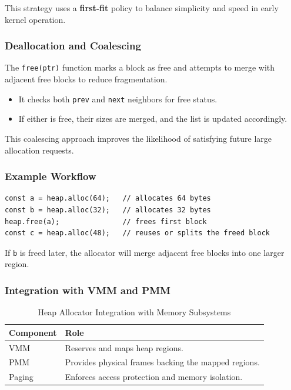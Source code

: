 \documentclass[12pt]{extarticle}
\begin{document}
This strategy uses a \textbf{first-fit} policy to balance simplicity and speed in early kernel operation.

\subsubsection*{Deallocation and Coalescing}

The \texttt{free(ptr)} function marks a block as free and attempts to merge with adjacent free blocks to reduce fragmentation.

\begin{itemize}
    \item It checks both \texttt{prev} and \texttt{next} neighbors for free status.
    \item If either is free, their sizes are merged, and the list is updated accordingly.
\end{itemize}

This coalescing approach improves the likelihood of satisfying future large allocation requests.

\subsubsection*{Example Workflow}

\begin{lstlisting}[breaklines=true, basicstyle=\ttfamily\footnotesize]
const a = heap.alloc(64);   // allocates 64 bytes
const b = heap.alloc(32);   // allocates 32 bytes
heap.free(a);               // frees first block
const c = heap.alloc(48);   // reuses or splits the freed block
\end{lstlisting}

If \texttt{b} is freed later, the allocator will merge adjacent free blocks into one larger region.

\subsubsection*{Integration with VMM and PMM}

\begin{table}[H]
\centering
\begin{tabular}{|l|p{10cm}|}
\hline
\textbf{Component} & \textbf{Role} \\
\hline
VMM & Reserves and maps heap regions. \\
PMM & Provides physical frames backing the mapped regions. \\
Paging & Enforces access protection and memory isolation. \\
\hline
\end{tabular}
\caption{Heap Allocator Integration with Memory Subsystems}
\end{table}
\end{document}
